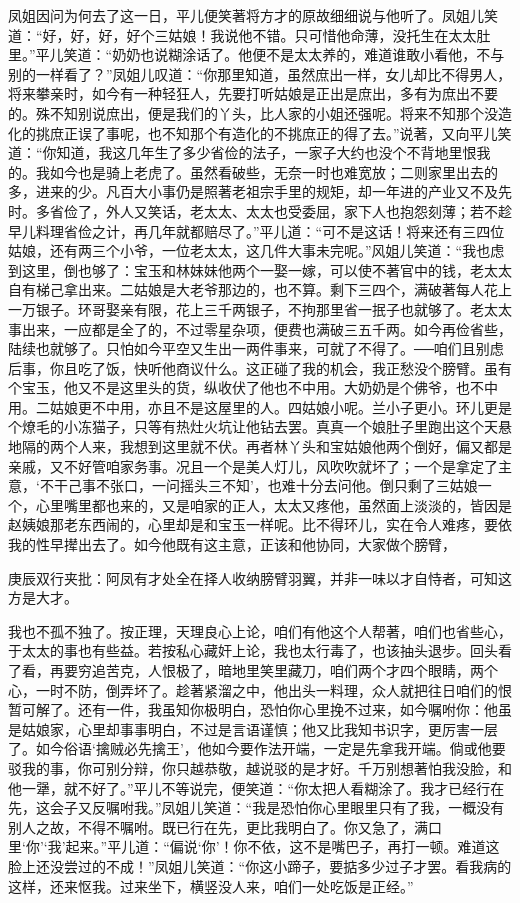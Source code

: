 \begin{parag}
    凤姐因问为何去了这一日，平儿便笑著将方才的原故细细说与他听了。凤姐儿笑道：“好，好，好，好个三姑娘！我说他不错。只可惜他命薄，没托生在太太肚里。”平儿笑道：“奶奶也说糊涂话了。他便不是太太养的，难道谁敢小看他，不与别的一样看了？”凤姐儿叹道：“你那里知道，虽然庶出一样，女儿却比不得男人，将来攀亲时，如今有一种轻狂人，先要打听姑娘是正出是庶出，多有为庶出不要的。殊不知别说庶出，便是我们的丫头，比人家的小姐还强呢。将来不知那个没造化的挑庶正误了事呢，也不知那个有造化的不挑庶正的得了去。”说著，又向平儿笑道：“你知道，我这几年生了多少省俭的法子，一家子大约也没个不背地里恨我的。我如今也是骑上老虎了。虽然看破些，无奈一时也难宽放；二则家里出去的多，进来的少。凡百大小事仍是照著老祖宗手里的规矩，却一年进的产业又不及先时。多省俭了，外人又笑话，老太太、太太也受委屈，家下人也抱怨刻薄；若不趁早儿料理省俭之计，再几年就都赔尽了。”平儿道：“可不是这话！将来还有三四位姑娘，还有两三个小爷，一位老太太，这几件大事未完呢。”风姐儿笑道：“我也虑到这里，倒也够了：宝玉和林妹妹他两个一娶一嫁，可以使不著官中的钱，老太太自有梯己拿出来。二姑娘是大老爷那边的，也不算。剩下三四个，满破著每人花上一万银子。环哥娶亲有限，花上三千两银子，不拘那里省一抿子也就够了。老太太事出来，一应都是全了的，不过零星杂项，便费也满破三五千两。如今再俭省些，陆续也就够了。只怕如今平空又生出一两件事来，可就了不得了。──咱们且别虑后事，你且吃了饭，快听他商议什么。这正碰了我的机会，我正愁没个膀臂。虽有个宝玉，他又不是这里头的货，纵收伏了他也不中用。大奶奶是个佛爷，也不中用。二姑娘更不中用，亦且不是这屋里的人。四姑娘小呢。兰小子更小。环儿更是个燎毛的小冻猫子，只等有热灶火坑让他钻去罢。真真一个娘肚子里跑出这个天悬地隔的两个人来，我想到这里就不伏。再者林丫头和宝姑娘他两个倒好，偏又都是亲戚，又不好管咱家务事。况且一个是美人灯儿，风吹吹就坏了；一个是拿定了主意，‘不干己事不张口，一问摇头三不知’，也难十分去问他。倒只剩了三姑娘一个，心里嘴里都也来的，又是咱家的正人，太太又疼他，虽然面上淡淡的，皆因是赵姨娘那老东西闹的，心里却是和宝玉一样呢。比不得环儿，实在令人难疼，要依我的性早撵出去了。如今他既有这主意，正该和他协同，大家做个膀臂，\begin{note}庚辰双行夹批：阿凤有才处全在择人收纳膀臂羽翼，并非一味以才自恃者，可知这方是大才。\end{note}我也不孤不独了。按正理，天理良心上论，咱们有他这个人帮著，咱们也省些心，于太太的事也有些益。若按私心藏奸上论，我也太行毒了，也该抽头退步。回头看了看，再要穷追苦克，人恨极了，暗地里笑里藏刀，咱们两个才四个眼睛，两个心，一时不防，倒弄坏了。趁著紧溜之中，他出头一料理，众人就把往日咱们的恨暂可解了。还有一件，我虽知你极明白，恐怕你心里挽不过来，如今嘱咐你：他虽是姑娘家，心里却事事明白，不过是言语谨慎；他又比我知书识字，更厉害一层了。如今俗语‘擒贼必先擒王’，他如今要作法开端，一定是先拿我开端。倘或他要驳我的事，你可别分辩，你只越恭敬，越说驳的是才好。千万别想著怕我没脸，和他一犟，就不好了。”平儿不等说完，便笑道：“你太把人看糊涂了。我才已经行在先，这会子又反嘱咐我。”凤姐儿笑道：“我是恐怕你心里眼里只有了我，一概没有别人之故，不得不嘱咐。既已行在先，更比我明白了。你又急了，满口里‘你’‘我’起来。”平儿道：“偏说‘你’！你不依，这不是嘴巴子，再打一顿。难道这脸上还没尝过的不成！”凤姐儿笑道：“你这小蹄子，要掂多少过子才罢。看我病的这样，还来怄我。过来坐下，横竖没人来，咱们一处吃饭是正经。”
\end{parag}


